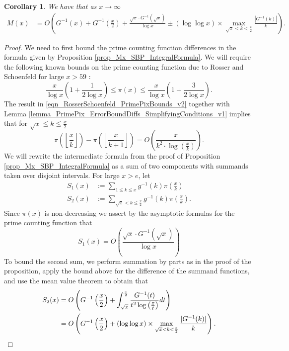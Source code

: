 \documentclass[11pt,reqno,a4letter]{article}
\numberwithin{figure}{section}
\numberwithin{table}{section}
\newcommand{\Floor}[2]{\ensuremath{\left\lfloor \frac{#1}{#2} \right\rfloor}}
\theoremstyle{plain}
\newtheorem{cor}[theorem]{Corollary}
\numberwithin{theorem}{section}
\theoremstyle{definition}
\begin{document}
\begin{cor} 
\label{cor_IntFormulaGInvx_for_Mx_v1} 
We have that as $x \rightarrow \infty$ 
\begin{align*}
     M(x) & = O\left(G^{-1}(x) + G^{-1}\left(\frac{x}{2}\right) + 
     \frac{\sqrt{x} \cdot G^{-1}(\sqrt{x})}{\log x} \pm 
     (\log\log x) \times \max_{\sqrt{x} < k < \frac{x}{2}} 
     \frac{|G^{-1}(k)|}{k}\right). 
\end{align*} 
\end{cor}
\begin{proof}
We need to first bound the prime counting function differences in the formula given by 
Proposition \ref{prop_Mx_SBP_IntegralFormula}. 
We will require the following known bounds on the prime counting 
function due to Rosser and Schoenfeld for large $x > 59$ 
\cite[Thm.\ 1]{ROSSER-SCHOENFELD-1962}: 
\begin{equation} 
\label{eqn_RosserSchoenfeld_PrimePixBounds_v2} 
\frac{x}{\log x}\left(1 + \frac{1}{2\log x}\right) \leq \pi(x) \leq 
     \frac{x}{\log x}\left(1 + \frac{3}{2 \log x}\right). 
\end{equation} 
The result in \eqref{eqn_RosserSchoenfeld_PrimePixBounds_v2} together with 
Lemma \ref{lemma_PrimePix_ErrorBoundDiffs_SimplifyingConditions_v1} implies that 
for $\sqrt{x} \leq k \leq \frac{x}{2}$ 
\[
\pi\left(\Floor{x}{k}\right) - \pi\left(\Floor{x}{k+1}\right) = 
     O\left(\frac{x}{k^2 \cdot \log\left(\frac{x}{k}\right)}\right). 
\]
We will rewrite the intermediate formula from the proof of 
Proposition \ref{prop_Mx_SBP_IntegralFormula} 
as a sum of two components with summands taken over disjoint intervals. 
For large $x > e$, let 
\begin{align*}
S_1(x) & := \sum_{1 \leq k \leq x} g^{-1}(k) \pi\left(\frac{x}{k}\right) \\ 
S_2(x) & := \sum_{\sqrt{x} < k \leq \frac{x}{2}} g^{-1}(k) \pi\left(\frac{x}{k}\right).
\end{align*}
Since $\pi(x)$ is non-decreasing we assert by the asymptotic formulas for the 
prime counting function that 
\[
S_1(x) = O\left(\frac{\sqrt{x} \cdot G^{-1}(\sqrt{x})}{\log x}\right) 
\]
To bound the second sum, we perform summation by parts as in the proof of 
the proposition, apply the bound above for the difference of the 
summand functions, and use the mean value theorem to obtain that 
\begin{align*} 
S_2(x) & = O\left(G^{-1}\left(\frac{x}{2}\right) + \int_{\sqrt{x}}^{\frac{x}{2}} 
     \frac{G^{-1}(t)}{t^2 \log\left(\frac{x}{t}\right)} dt\right) \\ 
     & = O\left(G^{-1}\left(\frac{x}{2}\right) + (\log\log x) \times 
     \max_{\sqrt{x} < k < \frac{x}{2}} \frac{|G^{-1}(k)|}{k}\right). 
     \qedhere 
\end{align*} 
\end{proof} 
\end{document}

